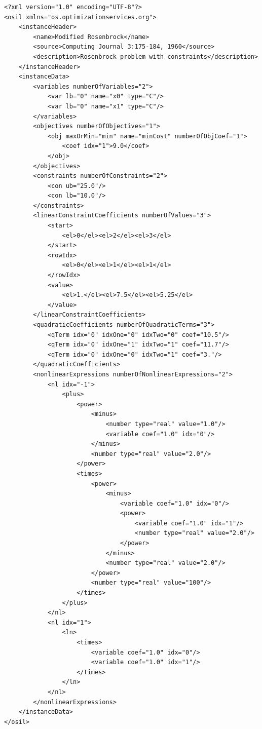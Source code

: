 \documentclass[11pt]{article}
\renewcommand{\_}{{\char"5F}}
\renewcommand{\{}{{\char"7B}}
\renewcommand{\}}{{\char"7D}}
\renewcommand{\^}{{\char"0D}}
\renewcommand{\'}{{\char"0D}}
\begin{document}
\begin{enumerate}[Step 1:]
{\normalsize \baselineskip 16pt \vspace{2pt}
\begin{verbatim}
<?xml version="1.0" encoding="UTF-8"?>
<osil xmlns="os.optimizationservices.org">
    <instanceHeader>
        <name>Modified Rosenbrock</name>
        <source>Computing Journal 3:175-184, 1960</source>
        <description>Rosenbrock problem with constraints</description>
    </instanceHeader>
    <instanceData>
        <variables numberOfVariables="2">
            <var lb="0" name="x0" type="C"/>
            <var lb="0" name="x1" type="C"/>
        </variables>
        <objectives numberOfObjectives="1">
            <obj maxOrMin="min" name="minCost" numberOfObjCoef="1">
                <coef idx="1">9.0</coef>
            </obj>
        </objectives>
        <constraints numberOfConstraints="2">
            <con ub="25.0"/>
            <con lb="10.0"/>
        </constraints>
        <linearConstraintCoefficients numberOfValues="3">
            <start>
                <el>0</el><el>2</el><el>3</el>
            </start>
            <rowIdx>
                <el>0</el><el>1</el><el>1</el>
            </rowIdx>
            <value>
                <el>1.</el><el>7.5</el><el>5.25</el>
            </value>
        </linearConstraintCoefficients>
        <quadraticCoefficients numberOfQuadraticTerms="3">
            <qTerm idx="0" idxOne="0" idxTwo="0" coef="10.5"/>
            <qTerm idx="0" idxOne="1" idxTwo="1" coef="11.7"/>
            <qTerm idx="0" idxOne="0" idxTwo="1" coef="3."/>
        </quadraticCoefficients>
        <nonlinearExpressions numberOfNonlinearExpressions="2">
            <nl idx="-1">
                <plus>
                    <power>
                        <minus>
                            <number type="real" value="1.0"/>
                            <variable coef="1.0" idx="0"/>
                        </minus>
                        <number type="real" value="2.0"/>
                    </power>
                    <times>
                        <power>
                            <minus>
                                <variable coef="1.0" idx="0"/>
                                <power>
                                    <variable coef="1.0" idx="1"/>
                                    <number type="real" value="2.0"/>
                                </power>
                            </minus>
                            <number type="real" value="2.0"/>
                        </power>
                        <number type="real" value="100"/>
                    </times>
                </plus>
            </nl>
            <nl idx="1">
                <ln>
                    <times>
                        <variable coef="1.0" idx="0"/>
                        <variable coef="1.0" idx="1"/>
                    </times>
                </ln>
            </nl>
        </nonlinearExpressions>
    </instanceData>
</osil>
\end{verbatim}

}
\end{enumerate}
\end{document}
